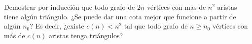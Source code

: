 
\item Demostrar por inducción que todo grafo de $2n$ vértices con mas de $n^2$ aristas tiene algún triángulo.  ¿Se puede dar una cota mejor que funcione a partir de algún $n_0$? Es decir, ¿existe $c(n) < n^2$ tal que todo grafo de $n \geq n_0$ vértices con más de $c(n)$ aristas tenga triángulos?


